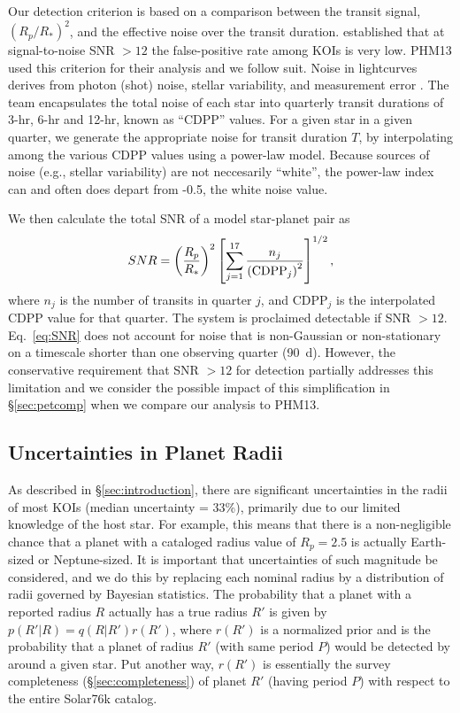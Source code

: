 Our detection criterion is based on a comparison
between the transit signal, $(R_p/R_*)^2$, and the
effective noise over the transit duration.  \citet{Fressin2013}
established that at signal-to-noise SNR $>12$ the false-positive rate
among \kep{} KOIs is very low.  PHM13 used this criterion for their
analysis and we follow suit.  Noise in \kep{}
lightcurves derives from photon (shot) noise, stellar variability,
and measurement error \citep{Koch2010}.  The \kep{} team encapsulates
the total noise of each star into quarterly transit durations of 
3-hr, 6-hr and 12-hr, known as ``CDPP''
\citep[Combined Differential Photometric Precision,][]{Christiansen2012} 
values. For a given star in a given quarter, we generate the appropriate
noise for transit duration $T$, by interpolating among the various
CDPP values using a power-law model.  Because sources of noise
(e.g., stellar variability) are not neccesarily ``white'', 
the power-law index can and often does depart from -0.5, the
white noise value.

 We then calculate the total SNR of a model star-planet pair as
\begin{equation}
SNR = \left(\frac{R_p}{R_*}\right)^2 \left[\sum\limits_{j=1}^{17}
\frac{n_j}{\left({\rm CDPP}_j\right)^2} \right]^{1/2},
\label{eq:SNR}
\end{equation}
where $n_j$ is the number of transits in quarter $j$, and CDPP$_j$ is
the interpolated CDPP value for that quarter.  The system is 
proclaimed detectable if SNR $> 12$. Eq.~\ref{eq:SNR} does
not account for noise that is non-Gaussian or non-stationary on a
timescale shorter than one observing quarter (90~d).  However, the
conservative requirement that SNR $> 12$ for detection
partially addresses this limitation and we consider the possible impact 
of this simplification in \S\ref{sec:petcomp} when we compare our analysis 
to PHM13.

\subsection{Uncertainties in Planet Radii}
\label{sec:plerr}

As described in \S\ref{sec:introduction}, there are significant
uncertainties in the radii of most KOIs (median uncertainty = 33\%),
primarily due to our limited knowledge of the host star.  For example,
this means that there is a non-negligible chance that a planet
with a cataloged radius value of $R_p = 2.5$\rearth{}
is actually Earth-sized or Neptune-sized.  It is important that
uncertainties of such magnitude be considered, and we do this by
replacing each nominal radius by a distribution of radii governed by
Bayesian statistics.  The probability that a planet with a reported 
radius $R$ actually has a true radius
$R'$ is given by $p(R'|R) = q(R|R')r(R')$, where $r(R')$ is a
normalized prior and is the probability that a planet of radius 
$R'$ (with same period $P$) would be detected by \kep{} around a given 
star. Put another way, $r(R')$ is essentially the survey completeness 
(\S\ref{sec:completeness}) of planet $R'$ (having period $P$) with 
respect to the entire Solar76k catalog. 

